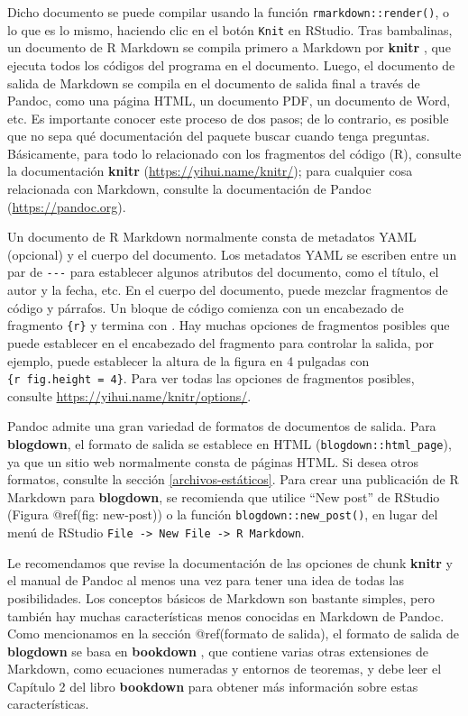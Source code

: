 \documentclass[12pt,]{krantz}
\theoremstyle{definition}
\theoremstyle{definition}
\theoremstyle{definition}
\theoremstyle{remark}
\begin{document}
Dicho documento se puede compilar usando la función
\texttt{rmarkdown::render()}, o lo que es lo mismo, haciendo clic en el
botón \texttt{Knit} en RStudio. Tras bambalinas, un documento de R
Markdown se compila primero a Markdown por
\textbf{knitr} \citep{R-knitr}, que ejecuta todos los códigos del
programa en el documento. Luego, el documento de salida de Markdown se
compila en el documento de salida final a través de Pandoc, como una
página HTML, un documento PDF, un documento de Word, etc. Es importante
conocer este proceso de dos pasos; de lo contrario, es posible que no
sepa qué documentación del paquete buscar cuando tenga preguntas.
Básicamente, para todo lo relacionado con los fragmentos del código (R),
consulte la documentación \textbf{knitr}
(\url{https://yihui.name/knitr/}); para cualquier cosa relacionada con
Markdown, consulte la documentación de Pandoc
(\url{https://pandoc.org}).

Un documento de R Markdown normalmente consta de metadatos
YAML (opcional) y el cuerpo del documento. Los metadatos
YAML se escriben entre un par de \texttt{-\/-\/-} para establecer
algunos atributos del documento, como el título, el autor y la fecha,
etc. En el cuerpo del documento, puede mezclar fragmentos de código y
párrafos. Un bloque de código comienza con un encabezado de fragmento
\texttt{\textasciigrave{}\textasciigrave{}\textasciigrave{}\{r\}} y
termina con
\texttt{\textasciigrave{}\textasciigrave{}\textasciigrave{}}. Hay muchas
opciones de fragmentos posibles que puede establecer en el encabezado
del fragmento para controlar la salida, por ejemplo, puede establecer la
altura de la figura en 4 pulgadas con
\texttt{\textasciigrave{}\textasciigrave{}\textasciigrave{}\{r\ fig.height\ =\ 4\}}.
Para ver todas las opciones de fragmentos posibles, consulte
\url{https://yihui.name/knitr/options/}.

Pandoc admite una gran variedad de formatos de documentos de salida.
Para \textbf{blogdown}, el formato de salida se establece en HTML
(\texttt{blogdown::html\_page}), ya que un sitio web normalmente consta
de páginas HTML. Si desea otros formatos, consulte la sección
\ref{archivos-estáticos}. Para crear una publicación de R Markdown para
\textbf{blogdown}, se recomienda que utilice ``New post'' de RStudio
(Figura @ref(fig: new-post)) o la función
\texttt{blogdown::new\_post()}, en lugar del menú de RStudio
\texttt{File\ -\textgreater{}\ New\ File\ -\textgreater{}\ R\ Markdown}.

Le recomendamos que revise la documentación de las opciones de chunk
\textbf{knitr} y el manual de Pandoc al menos una vez para tener una
idea de todas las posibilidades. Los conceptos básicos de Markdown son
bastante simples, pero también hay muchas características menos
conocidas en Markdown de Pandoc. Como mencionamos en la sección
@ref(formato de salida), el formato de salida de \textbf{blogdown} se
basa en \textbf{bookdown} \citep{R-bookdown}, que contiene varias otras
extensiones de Markdown, como ecuaciones numeradas y entornos de
teoremas, y debe leer el Capítulo 2 del libro \textbf{bookdown}
\citep{xie2016} para obtener más información sobre estas
características.
\end{document}
